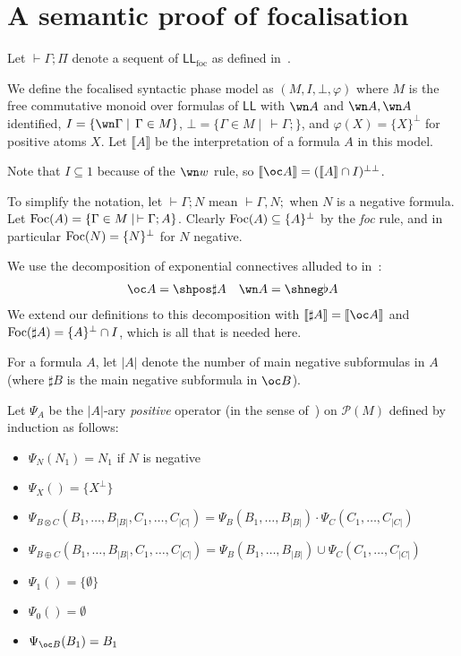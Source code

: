 \documentclass[11pt]{article}
\author{Naïm Favier}
\newcommand\LL{\textsf{LL}}
\newcommand\LLfoc{{\LL_\text{foc}}}
\newcommand\size[1]{{\lvert #1 \rvert}}
\newcommand\sem[1]{{\llbracket #1 \rrbracket}}
\newcommand\biperp{{\perp\perp}}
\newcommand\Foc{\textup{Foc}}
\begin{document}
\section{A semantic proof of focalisation}

Let $\vdash \Gamma; \Pi$ denote a sequent of $\LLfoc$ as defined in~\cite{laurent}.

We define the focalised syntactic phase model as $(M, I, \bot, \varphi)$ where $M$ is the
free commutative monoid over formulas of $\LL$ with $\wn A$ and $\wn A, \wn A$ identified,
$I = \{\wn \Gamma\mid\,\Gamma\in M\}$, $\bot = \{\Gamma \in M \mid\,\vdash \Gamma;\}$, and
$\varphi(X) = \{X\}^\perp$ for positive atoms $X$. Let $\sem{A}$ be the interpretation of a
formula $A$ in this model.

Note that $I \subseteq 1$ because of the $\wn w$ rule, so $\sem{\oc A} = (\sem{A} \cap I)^\biperp$.

To simplify the notation, let $\vdash \Gamma; N$ mean $\vdash \Gamma, N;$ when $N$ is a negative formula.
Let $\Foc(A) = {\{\Gamma \in M \mid\, \vdash \Gamma; A\}}$.
Clearly $\Foc(A) \subseteq \{A\}^\perp$ by the \textit{foc} rule, and in particular
$\Foc(N) = \{N\}^\perp$ for $N$ negative.

We use the decomposition of exponential connectives alluded to in~\cite[section 4.1]{laurent}: \begin{align*}
    \oc A = \shpos\sharp A && \wn A = \shneg\flat A
\end{align*}
We extend our definitions to this decomposition with $\sem{\sharp A} = \sem{\oc A}$ and
$\Foc(\sharp A) = \{A\}^\perp \cap I$,
which is all that is needed here.

For a formula $A$, let $\size{A}$ denote the number of main negative subformulas in $A$
(where $\sharp B$ is the main negative subformula in $\oc B$).

Let $\Psi_A$ be the $\size{A}$-ary \emph{positive} operator (in the sense of~\cite[appendix F]{girard})
on $\mathcal P(M)$ defined by induction as follows:
\begin{itemize}
    \item $\Psi_N(N_1) = N_1$ if $N$ is negative
    \item $\Psi_X() = \{X^\perp\}$
    \item $\Psi_{B \otimes C}(B_1, \dots, B_\size{B}, C_1, \dots, C_\size{C}) = \Psi_B(B_1, \dots, B_\size{B}) \cdot \Psi_C(C_1, \dots, C_\size{C})$
    \item $\Psi_{B \oplus C}(B_1, \dots, B_\size{B}, C_1, \dots, C_\size{C}) = \Psi_B(B_1, \dots, B_\size{B}) \cup \Psi_C(C_1, \dots, C_\size{C})$
    \item $\Psi_1() = \{\emptyset\}$
    \item $\Psi_0() = \emptyset$
    \item $\Psi_{\oc B}(B_1) = B_1$
\end{itemize}
\end{document}
